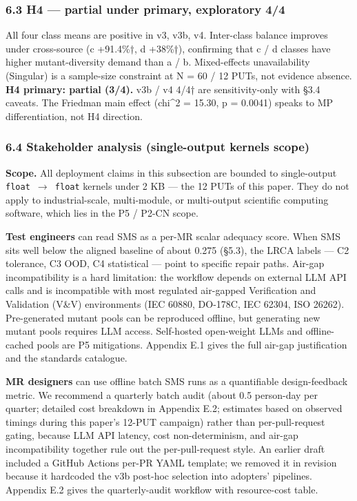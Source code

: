 \documentclass[review,12pt,authoryear]{elsarticle}
\begin{document}
\subsubsection{6.3 H4 --- partial under primary, exploratory
4/4}\label{h4-partial-under-primary-exploratory-44}

All four class means are positive in v3, v3b, v4. Inter-class balance
improves under cross-source (c +91.4\%†, d +38\%†), confirming that c /
d classes have higher mutant-diversity demand than a / b. Mixed-effects
unavailability (Singular) is a sample-size constraint at N = 60 / 12
PUTs, not evidence absence. \textbf{H4 primary: partial (3/4).} v3b / v4
4/4† are sensitivity-only with §3.4 caveats. The Friedman main effect
(chi\^{}2 = 15.30, p = 0.0041) speaks to MP differentiation, not H4
direction.

\subsubsection{6.4 Stakeholder analysis (single-output kernels
scope)}\label{stakeholder-analysis-single-output-kernels-scope}

\textbf{Scope.} All deployment claims in this subsection are bounded to
single-output \texttt{float\ $\to$\ float} kernels under 2 KB --- the 12
PUTs of this paper. They do not apply to industrial-scale, multi-module,
or multi-output scientific computing software, which lies in the P5 /
P2-CN scope.

\textbf{Test engineers} can read SMS as a per-MR scalar adequacy score.
When SMS sits well below the aligned baseline of about 0.275 (§5.3), the
LRCA labels --- C2 tolerance, C3 OOD, C4 statistical --- point to
specific repair paths. Air-gap incompatibility is a hard limitation: the
workflow depends on external LLM API calls and is incompatible with most
regulated air-gapped Verification and Validation (V\&V) environments
(IEC 60880, DO-178C, IEC 62304, ISO 26262). Pre-generated mutant pools
can be reproduced offline, but generating new mutant pools requires LLM
access. Self-hosted open-weight LLMs and offline-cached pools are P5
mitigations. Appendix E.1 gives the full air-gap justification and the
standards catalogue.

\textbf{MR designers} can use offline batch SMS runs as a quantifiable
design-feedback metric. We recommend a quarterly batch audit (about 0.5
person-day per quarter; detailed cost breakdown in Appendix E.2;
estimates based on observed timings during this paper's 12-PUT campaign)
rather than per-pull-request gating, because LLM API latency, cost
non-determinism, and air-gap incompatibility together rule out the
per-pull-request style. An earlier draft included a GitHub Actions
per-PR YAML template; we removed it in revision because it hardcoded the
v3b post-hoc selection into adopters' pipelines. Appendix E.2 gives the
quarterly-audit workflow with resource-cost table.
\end{document}

